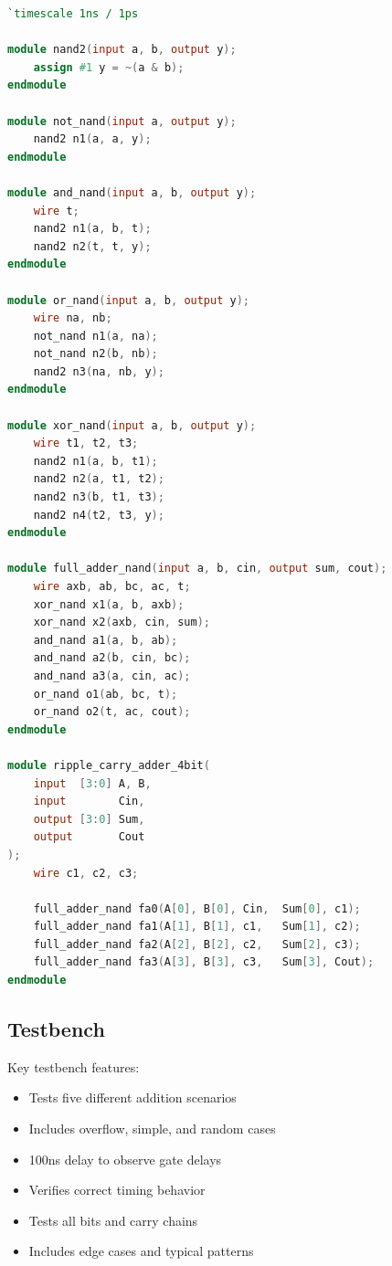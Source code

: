 \documentclass{article}
\begin{document}
\begin{tcolorbox}[title=NAND-based Adder Code, breakable]
\begin{lstlisting}[language=Verilog]
`timescale 1ns / 1ps

module nand2(input a, b, output y);
    assign #1 y = ~(a & b);
endmodule

module not_nand(input a, output y);
    nand2 n1(a, a, y);
endmodule

module and_nand(input a, b, output y);
    wire t;
    nand2 n1(a, b, t);
    nand2 n2(t, t, y);
endmodule

module or_nand(input a, b, output y);
    wire na, nb;
    not_nand n1(a, na);
    not_nand n2(b, nb);
    nand2 n3(na, nb, y);
endmodule

module xor_nand(input a, b, output y);
    wire t1, t2, t3;
    nand2 n1(a, b, t1);
    nand2 n2(a, t1, t2);
    nand2 n3(b, t1, t3);
    nand2 n4(t2, t3, y);
endmodule

module full_adder_nand(input a, b, cin, output sum, cout);
    wire axb, ab, bc, ac, t;
    xor_nand x1(a, b, axb);
    xor_nand x2(axb, cin, sum);
    and_nand a1(a, b, ab);
    and_nand a2(b, cin, bc);
    and_nand a3(a, cin, ac);
    or_nand o1(ab, bc, t);
    or_nand o2(t, ac, cout);
endmodule

module ripple_carry_adder_4bit(
    input  [3:0] A, B,
    input        Cin,
    output [3:0] Sum,
    output       Cout
);
    wire c1, c2, c3;
    
    full_adder_nand fa0(A[0], B[0], Cin,  Sum[0], c1);
    full_adder_nand fa1(A[1], B[1], c1,   Sum[1], c2);
    full_adder_nand fa2(A[2], B[2], c2,   Sum[2], c3);
    full_adder_nand fa3(A[3], B[3], c3,   Sum[3], Cout);
endmodule
\end{lstlisting}
\end{tcolorbox}

\subsection{Testbench}
Key testbench features:
\begin{itemize}
    \item Tests five different addition scenarios
    \item Includes overflow, simple, and random cases
    \item 100ns delay to observe gate delays
    \item Verifies correct timing behavior
    \item Tests all bits and carry chains
    \item Includes edge cases and typical patterns
\end{itemize}
\end{document}
